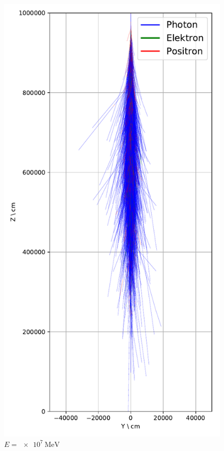 \documentclass[aspectratio=1610, captions=tableheading, 11pt]{beamer}
\begin{document}
\begin{frame}
\begin{columns}
    \begin{column}{0.33\textwidth}
      \begin{figure}
          \centering
          \includegraphics[height=0.9\textheight]{shower_presentation/2d_shower_1e7.png}
          \caption*{$E = \SI{e7}{\mega\electronvolt}$}
      \end{figure}    
    \end{column}
  \end{columns}
\end{frame}
\end{document}
